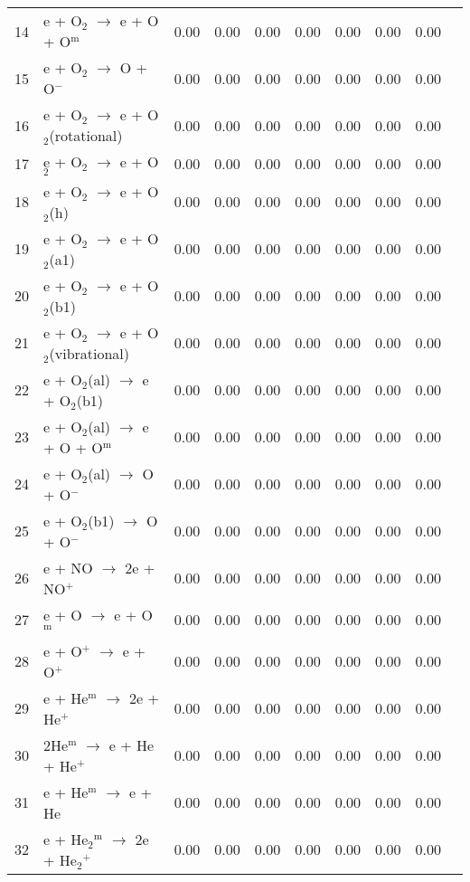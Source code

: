 \documentclass{article}
\begin{document}
\begin{table}[H]
{\begin{tabu}{clcccccccc}
      14 & e + O$_{2}$ $\rightarrow$ e + O + O$^\text{m}$ & 0.00 & 0.00 & 0.00 & 0.00 & 0.00 & 0.00 & 0.00 &  \\
      15 & e + O$_{2}$ $\rightarrow$ O + O$^{-}$ & 0.00 & 0.00 & 0.00 & 0.00 & 0.00 & 0.00 & 0.00 &  \\
      16 & e + O$_{2}$ $\rightarrow$ e + O$_{2}$(rotational) & 0.00 & 0.00 & 0.00 & 0.00 & 0.00 & 0.00 & 0.00 &  \\
      17 & e + O$_{2}$ $\rightarrow$ e + O$_{2}$ & 0.00 & 0.00 & 0.00 & 0.00 & 0.00 & 0.00 & 0.00 &  \\
      18 & e + O$_{2}$ $\rightarrow$ e + O$_{2}$(h) & 0.00 & 0.00 & 0.00 & 0.00 & 0.00 & 0.00 & 0.00 &  \\
      19 & e + O$_{2}$ $\rightarrow$ e + O$_{2}$(a1) & 0.00 & 0.00 & 0.00 & 0.00 & 0.00 & 0.00 & 0.00 &  \\
      20 & e + O$_{2}$ $\rightarrow$ e + O$_{2}$(b1) & 0.00 & 0.00 & 0.00 & 0.00 & 0.00 & 0.00 & 0.00 &  \\
      21 & e + O$_{2}$ $\rightarrow$ e + O$_{2}$(vibrational) & 0.00 & 0.00 & 0.00 & 0.00 & 0.00 & 0.00 & 0.00 &  \\
      22 & e + O$_{2}$(al) $\rightarrow$ e + O$_{2}$(b1) & 0.00 & 0.00 & 0.00 & 0.00 & 0.00 & 0.00 & 0.00 &  \\
      23 & e + O$_{2}$(al) $\rightarrow$ e + O + O$^\text{m}$ & 0.00 & 0.00 & 0.00 & 0.00 & 0.00 & 0.00 & 0.00 &  \\
      24 & e + O$_{2}$(al) $\rightarrow$ O + O$^{-}$ & 0.00 & 0.00 & 0.00 & 0.00 & 0.00 & 0.00 & 0.00 &  \\
      25 & e + O$_{2}$(b1) $\rightarrow$ O + O$^{-}$ & 0.00 & 0.00 & 0.00 & 0.00 & 0.00 & 0.00 & 0.00 &  \\
      26 & e + NO $\rightarrow$ 2e + NO$^{+}$ & 0.00 & 0.00 & 0.00 & 0.00 & 0.00 & 0.00 & 0.00 &  \\
      27 & e + O $\rightarrow$ e + O$^\text{m}$ & 0.00 & 0.00 & 0.00 & 0.00 & 0.00 & 0.00 & 0.00 &  \\
      28 & e + O$^{+}$ $\rightarrow$ e + O$^{+}$ & 0.00 & 0.00 & 0.00 & 0.00 & 0.00 & 0.00 & 0.00 &  \\
      29 & e + He$^\text{m}$ $\rightarrow$ 2e + He$^{+}$ & 0.00 & 0.00 & 0.00 & 0.00 & 0.00 & 0.00 & 0.00 &  \\
      30 & 2He$^\text{m}$ $\rightarrow$ e + He + He$^{+}$ & 0.00 & 0.00 & 0.00 & 0.00 & 0.00 & 0.00 & 0.00 &  \\
      31 & e + He$^\text{m}$ $\rightarrow$ e + He & 0.00 & 0.00 & 0.00 & 0.00 & 0.00 & 0.00 & 0.00 &  \\
      32 & e + He$_2$$^\text{m}$ $\rightarrow$ 2e + He$_{2}$$^{+}$ & 0.00 & 0.00 & 0.00 & 0.00 & 0.00 & 0.00 & 0.00 &  \\
    \end{tabu}
  }
\end{table}
\end{document}

